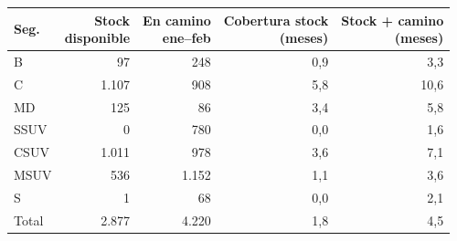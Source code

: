 \begin{tabular}{lrrrr}
\toprule
Seg. & \makecell{Stock\\disponible} & \makecell{En camino\\ene--feb} & \makecell{Cobertura stock\\(meses)} & \makecell{Stock + camino\\(meses)} \\
\midrule
B & 97 & 248 & 0,9 & 3,3 \\
C & 1.107 & 908 & 5,8 & 10,6 \\
MD & 125 & 86 & 3,4 & 5,8 \\
SSUV & 0 & 780 & 0,0 & 1,6 \\
CSUV & 1.011 & 978 & 3,6 & 7,1 \\
MSUV & 536 & 1.152 & 1,1 & 3,6 \\
S & 1 & 68 & 0,0 & 2,1 \\
Total & 2.877 & 4.220 & 1,8 & 4,5 \\
\bottomrule
\end{tabular}
